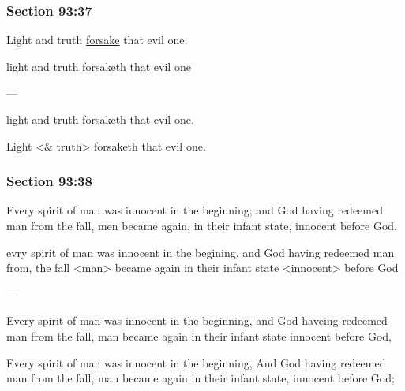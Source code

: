 	\subsubsection{Section 93:37} %
		\label{DC93-37}

		Light and truth \hyperref[FORSAKE]{forsake} that evil one.

		\begin{framed}
		\scriptsize
			\begin{compactdesc}
				\item[JSP] light and truth forsaketh that evil one
				\item[BC] ---
				\item[RB2] light and truth forsaketh that evil one. 
				\item[RB1] Light <\& truth> forsaketh that evil one. 
			\end{compactdesc}
		\end{framed}

	\subsubsection{Section 93:38} %
		\label{DC93-38}

		Every spirit of man was innocent in the beginning; and God having redeemed man from the fall, men became again, in their infant state, innocent before God.

		\begin{framed}
		\scriptsize
			\begin{compactdesc}
				\item[JSP] evry spirit of man was innocent in the begining, and God having redeemed man from, the fall <man> became again in their infant state <innocent> before God
				\item[BC] ---
				\item[RB2] Every spirit of man was innocent in the beginning, and God haveing redeemed man from the fall, man became again in their infant state innocent before God, 
				\item[RB1] Every spirit of man was innocent in the beginning, And God having redeemed man from the fall, man became again in their infant state, innocent before God; 
			\end{compactdesc}
		\end{framed}


